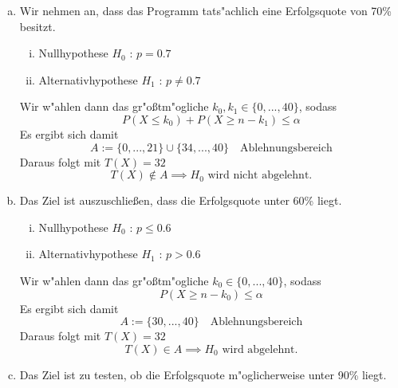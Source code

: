 \documentclass[10pt, oneside]{article}
\begin{document}
\begin{enumerate}[(a)]
    \item Wir nehmen an, dass das Programm tats"achlich eine Erfolgsquote von
        70\% besitzt.
        \begin{enumerate}[i)]
            \item Nullhypothese $H_0$ : $p = 0.7$
            \item Alternativhypothese $H_1$ : $p \neq 0.7$
        \end{enumerate}
        Wir w"ahlen dann das gr"o{\ss}tm"ogliche $k_0, k_1 \in \{0,...,40\}$,
        sodass
        \begin{equation*}
            P(X \leq k_0) + P(X \geq n - k_1) \leq \alpha
        \end{equation*}
        Es ergibt sich damit
        \begin{equation*}
            A := \{0,...,21\} \cup \{34,...,40\} \quad \text{Ablehnungsbereich}
        \end{equation*}
        Daraus folgt mit $T(X) = 32$
        \begin{equation*}
            T(X) \notin A \implies H_0 \text{ wird nicht abgelehnt.}
        \end{equation*}
    \item Das Ziel ist auszuschlie{\ss}en, dass die Erfolgsquote unter 60\% liegt.
        \begin{enumerate}[i)]
            \item Nullhypothese $H_0$ : $p \leq 0.6$
            \item Alternativhypothese $H_1$ : $p > 0.6$
        \end{enumerate}
        Wir w"ahlen dann das gr"o{\ss}tm"ogliche $k_0 \in \{0,...,40\}$,
        sodass
        \begin{equation*}
            P(X \geq n - k_0) \leq \alpha
        \end{equation*}
        Es ergibt sich damit
        \begin{equation*}
            A := \{30,...,40\} \quad \text{Ablehnungsbereich}
        \end{equation*}
        Daraus folgt mit $T(X) = 32$
        \begin{equation*}
            T(X) \in A \implies H_0 \text{ wird abgelehnt.}
        \end{equation*}
    \item Das Ziel ist zu testen, ob die Erfolgsquote m"oglicherweise unter 90\%
        liegt.
        \begin{enumerate}[i)]

\end{enumerate}
\end{enumerate}
\end{document}
